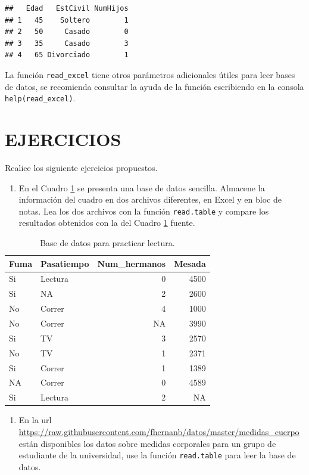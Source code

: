\documentclass[10pt,]{krantz}
\providecommand{\tightlist}{%
  \setlength{\itemsep}{0pt}\setlength{\parskip}{0pt}}
\begin{document}
\begin{verbatim}
##   Edad   EstCivil NumHijos
## 1   45    Soltero        1
## 2   50     Casado        0
## 3   35     Casado        3
## 4   65 Divorciado        1
\end{verbatim}

La función \texttt{read\_excel} tiene otros parámetros adicionales
útiles para leer bases de datos, se recomienda consultar la ayuda de la
función escribiendo en la consola \texttt{help(read\_excel)}.

\section*{EJERCICIOS}\label{ejercicios-3}


Realice los siguiente ejercicios propuestos.

\begin{enumerate}
\def\labelenumi{\arabic{enumi}.}
\tightlist
\item
  En el Cuadro \ref{tab:toy} se presenta una base de datos sencilla.
  Almacene la información del cuadro en dos archivos diferentes, en
  Excel y en bloc de notas. Lea los dos archivos con la función
  \texttt{read.table} y compare los resultados obtenidos con la del
  Cuadro \ref{tab:toy} fuente.
\end{enumerate}

\begin{table}

\caption{\label{tab:toy}Base de datos para practicar lectura.}
\centering
\begin{tabular}[t]{llrr}
\toprule
Fuma & Pasatiempo & Num\_hermanos & Mesada\\
\midrule
Si & Lectura & 0 & 4500\\
Si & NA & 2 & 2600\\
No & Correr & 4 & 1000\\
No & Correr & NA & 3990\\
Si & TV & 3 & 2570\\
\addlinespace
No & TV & 1 & 2371\\
Si & Correr & 1 & 1389\\
NA & Correr & 0 & 4589\\
Si & Lectura & 2 & NA\\
\bottomrule
\end{tabular}
\end{table}

\begin{enumerate}
\def\labelenumi{\arabic{enumi}.}
\setcounter{enumi}{1}
\tightlist
\item
  En la url
  \url{https://raw.githubusercontent.com/fhernanb/datos/master/medidas_cuerpo}
  están disponibles los datos sobre medidas corporales para un grupo de
  estudiante de la universidad, use la función \texttt{read.table} para
  leer la base de datos.
\end{enumerate}
\end{document}

